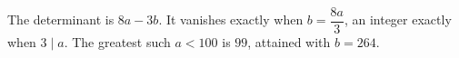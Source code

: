 The determinant is $8a-3b$. It vanishes exactly when $b=\dfrac{8a}{3}$, an integer exactly when $3\mid a$. The greatest such $a<100$ is $\boxed{99}$, attained with $b=264$.
